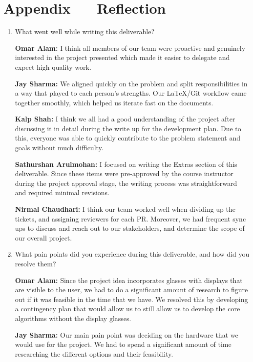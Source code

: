 \documentclass{article}
\begin{document}
\newpage{}

\section*{Appendix --- Reflection}

\begin{enumerate}
    \item What went well while writing this deliverable? 
    
    \textbf{Omar Alam:} I think all members of our team were proactive and
    genuinely interested in the project presented which made it easier to
    delegate and expect high quality work. 
    
    \textbf{Jay Sharma:} We aligned quickly on the problem and split
    responsibilities in a way that played to each person's strengths. Our
    LaTeX/Git workflow came together smoothly, which helped us iterate fast on
    the documents.

    \textbf{Kalp Shah:} I think we all had a good understanding of the project
    after discussing it in detail during the write up for the development plan.
    Due to this, everyone was able to quickly contribute to the problem
    statement and goals without much difficulty.

    \textbf{Sathurshan Arulmohan:} I focused on writing the Extras section of
    this deliverable. Since these items were pre-approved by the course
    instructor during the project approval stage, the writing process was
    straightforward and required minimal revisions.

    \textbf{Nirmal Chaudhari:} I think our team worked well when dividing up the
    tickets, and assigning reviewers for each PR. Moreover, we had frequent sync
    ups to discuss and reach out to our stakeholders, and determine the scope of
    our overall project. 

    \item What pain points did you experience during this deliverable, and how
    did you resolve them?

    \textbf{Omar Alam:} Since the project idea incorporates glasses with
    displays that are visible to the user, we had to do a significant amount of
    research to figure out if it was feasible in the time that we have. We
    resolved this by developing a contingency plan that would allow us to still
    allow us to develop the core algorithms without the display glasses.

    \textbf{Jay Sharma:} Our main pain point was deciding on the hardware that
     we would use for the project. We had to spend a significant amount of time
     researching the different options and their feasibility.
    

\end{enumerate}
\end{document}
